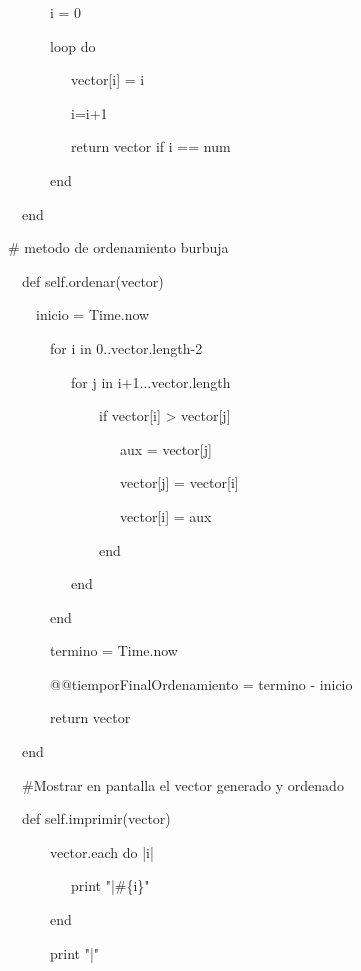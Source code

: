 {\bigskip
\noindent \ \ \ \ \ \       i = 0

\noindent \ \ \ \ \ \       loop do         

\noindent \ \ \ \ \ \ \ \ \          vector[i] = i

\noindent \ \ \ \ \ \ \ \ \          i=i+1

\noindent \ \ \ \ \ \ \ \ \          return vector if i == num

\bigskip 
\noindent \ \ \ \ \ \       end

\noindent \ \   end

\bigskip 
\noindent \# metodo de ordenamiento burbuja

\noindent \ \   def self.ordenar(vector)

\noindent \ \ \ \     inicio = Time.now

\noindent \ \ \ \ \ \       for i in 0..vector.length-2

\noindent \ \ \ \ \ \ \ \ \          for j in i+1...vector.length

\noindent \ \ \ \ \ \ \ \ \ \ \ \ \              if vector[i] > vector[j]

\noindent \ \ \ \ \ \ \ \ \ \ \ \ \ \ \ \                 aux = vector[j]

\noindent \ \ \ \ \ \ \ \ \ \ \ \ \ \ \ \                 vector[j] = vector[i]

\noindent \ \ \ \ \ \ \ \ \ \ \ \ \ \ \ \                 vector[i] = aux

\noindent \ \ \ \ \ \ \ \ \ \ \ \ \              end

\noindent \ \ \ \ \ \ \ \ \          end

\noindent \ \ \ \ \ \       end      

\noindent \ \ \ \ \ \       termino = Time.now

\noindent \ \ \ \ \ \       @@tiemporFinalOrdenamiento = termino - inicio

\noindent \ \ \ \ \ \       return vector

\noindent \ \   end

\bigskip 
\noindent \ \   \#Mostrar en pantalla el vector generado y ordenado

\noindent \ \   def self.imprimir(vector)

\noindent \ \ \ \ \ \       vector.each do |i|

\noindent \ \ \ \ \ \ \ \ \          print "|\#\{i\}"

\noindent \ \ \ \ \ \       end

\noindent \ \ \ \ \ \       print "|"

}
